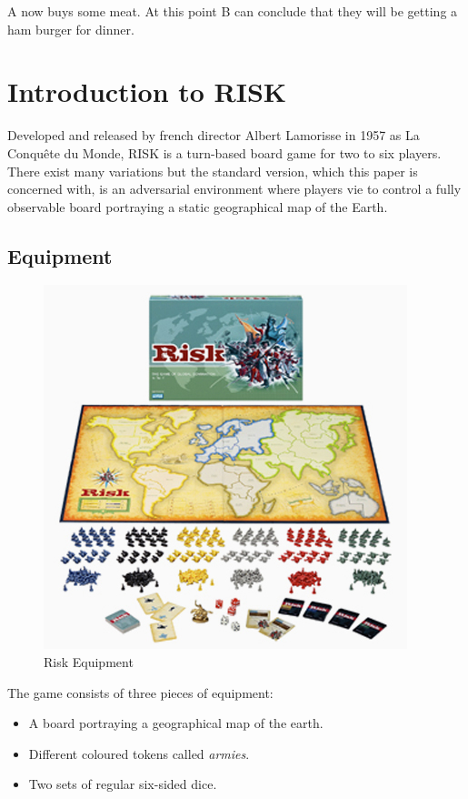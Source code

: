\documentclass[parskip]{cs4rep}
\begin{document}
A now buys some meat. At this point B can conclude that they will be getting a ham burger for dinner.

\newpage

\section{Introduction to RISK}

Developed and released by french director Albert Lamorisse in 1957 as La Conqu\^ete du Monde, RISK is a turn-based board game for two to six players. There exist many variations but the standard version, which this paper is concerned with, is an adversarial environment where players vie to control a fully observable board portraying a static geographical map of the Earth.

\subsection{Equipment}

\begin{figure}[h]
\centering
\includegraphics{images/risk_board}
\caption{Risk Equipment}
\label{fig:risk_equipment}
\end{figure}

The game consists of three pieces of equipment:

\begin{itemize}
\item
A board portraying a geographical map of the earth.
\item
Different coloured tokens called \textit{armies}.
\item
Two sets of regular six-sided dice.
\end{itemize}
\end{document}
